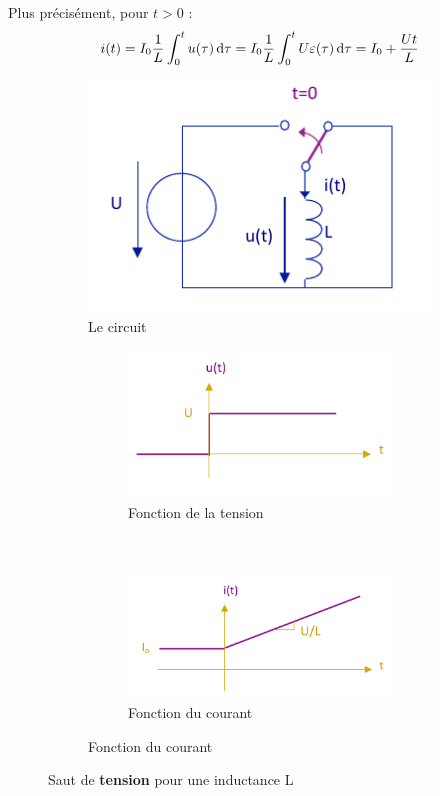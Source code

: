\documentclass[12pt,a4paper]{article}
\begin{document}
 Plus précisément, pour $t > 0$ :
\[i(t) = I_0 \frac{1}{L}\int_0^t u(\tau)\, \mathrm d \tau = I_0 \frac{1}{L}\int_0^t U\varepsilon(\tau)\, \mathrm d \tau = I_0 + \frac{Ut}{L}\]
\begin{figure}[!h]
	\centering
	\begin{subfigure}[c]{0.45\textwidth}
		\centering
		\includegraphics[scale=0.6]{images/saut_tension_L}
		\caption{Le circuit}
	\end{subfigure}
	\begin{subfigure}[c]{0.45\textwidth}
		\centering
		\begin{subfigure}{0.9\textwidth}
			\centering
			\includegraphics[scale=0.55]{images/fonction1_saut_tension_L}
			\caption{Fonction de la tension}
		\end{subfigure}\\
		\begin{subfigure}[c]{0.9\textwidth}
			\centering
			\includegraphics[scale=0.55]{images/fonction2_saut_tension_L}
			\caption{Fonction du courant}
		\end{subfigure}	
	\end{subfigure}
	\caption{Saut de \textbf{tension} pour une inductance L}
\end{figure}
\end{document}
